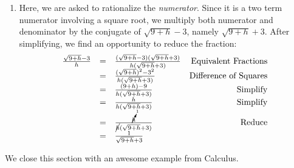 \documentclass{ximera}
\begin{document}
\begin{example}
\begin{enumerate}
\[\begin{array}{rclr}
													& = & \frac{3 \sqrt[5]{2^2 \cdot 3^4 \cdot x^3}}{\sqrt[5]{2^5} \sqrt[5]{3^5}\sqrt[5]{x^5}} & \text{Product Rule}\\ 
                          & = & \frac{3 \sqrt[5]{2^2 \cdot 3^4\cdot x^3}}{2 \cdot 3 \cdot x} & \text{Product Rule}\\ 
													& = & \frac{\cancel{3} \sqrt[5]{4 \cdot 81\cdot x^3}}{2 \cdot \cancel{3} \cdot x} & \text{Reduce}\\ 
													& = & \frac{\sqrt[5]{324x^3}}{2x} & \text{Simplify}\\
													\end{array}\]
													
\item  Here, we are asked to rationalize the \textit{numerator}.  Since it is a two term numerator involving a square root, we multiply both numerator and denominator by the conjugate of $\sqrt{9 + h} - 3$, namely $\sqrt{9 + h} + 3$.  After simplifying, we find an opportunity to reduce the fraction:\[\begin{array}{rclr}

\frac{\sqrt{9 + h} - 3}{h} & = & \frac{(\sqrt{9 + h} - 3)(\sqrt{9 + h} + 3)}{h(\sqrt{9 + h} + 3)} & \text{Equivalent Fractions} \\ 
& = & \frac{(\sqrt{9+h})^2 - 3^2}{h(\sqrt{9 + h} + 3)} & \text{Difference of Squares} \\ 
& = & \frac{(9+h) - 9}{h(\sqrt{9 + h} + 3)} & \text{Simplify} \\ 
& = & \frac{h}{h(\sqrt{9 + h} + 3)} & \text{Simplify} \\ 
& = & \frac{\cancelto{1}{h}}{\cancel{h}(\sqrt{9 + h} + 3)} & \text{Reduce}\\ 
& = & \frac{1}{\sqrt{9 + h} + 3} & \\

\end{array} \]

\end{enumerate}

\end{example}

We close this section with an awesome example from Calculus.%
\end{document}
